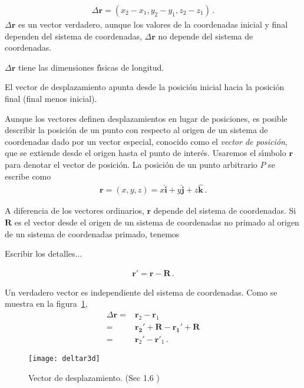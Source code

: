 \begin{align}
  \Delta\mathbf{r}=(x_2-x_1,y_2-y_1,z_2-z_1)\,.
\end{align}
$\Delta\mathbf{r}$ es un vector verdadero, aunque los valores de la coordenadas inicial y final dependen del sistema de coordenadas, $\Delta\mathbf{r}$ no depende del sistema de coordenadas. 

$\Delta\mathbf{r}$ tiene las dimensiones f\'\i sicas de longitud. 


El vector de desplazamiento apunta desde la posición inicial hacia la posición final (final menos inicial).


Aunque los vectores definen desplazamientos en lugar de posiciones, es posible describir la posici\'on de un punto con respecto al origen de un sistema de coordenadas dado por un vector especial, conocido como el \emph{vector de posici\'on}, que se extiende desde el origen hasta el punto de inter\'es. Usaremos el s\'\i mbolo $\mathbf{r}$ para denotar el vector de posici\'on. La posici\'on de un punto arbitrario $P$ se escribe como
\begin{align}
  \mathbf{r}=(x,y,z)=x\hat{\mathbf{i}}+
  y\hat{\mathbf{j}}+z\hat{\mathbf{k}}\,.
\end{align}

A diferencia de los vectores ordinarios, $\mathbf{r}$ depende del sistema de coordenadas. Si $\mathbf{R}$ es el vector desde el origen de un sistema de coordenadas no primado al origen de un sistema de coordenadas primado, tenemos
\begin{inprogress}
  Escribir los detalles...
\end{inprogress}
\begin{align}
  \mathbf{r}'=\mathbf{r}-\mathbf{R}\,.
\end{align}
\begin{frame}
  Un verdadero  vector es independiente del sistema de coordenadas. Como se muestra en la figura~\ref{fig:vpos},
\begin{align}
  \Delta\mathbf{r}=&\mathbf{r}_2-\mathbf{r}_1\nonumber\\
  =&\mathbf{\mathbf{r}_2'+\mathbf{R}}
-\mathbf{\mathbf{r}_1'+\mathbf{R}}\nonumber\\
=&\mathbf{r}_2'-\mathbf{r}'_1\,.
\end{align}
\end{frame}
\begin{frame}[plain]
  \begin{figure}
  \centering
  \texttt{[image: deltar3d]}
  \caption{Vector de desplazamiento. (Sec 1.6 \cite{Kleppner})}
  \label{fig:vpos}
\end{figure}
\end{frame}

